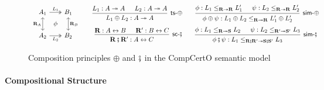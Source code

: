 \documentclass[acmsmall,screen,review,anonymous]{acmart}
\newcommand{\kw}[1]{\ensuremath{ \mathsf{#1} }}
\newcommand{\vcomp}{\fatsemi}
\begin{document}

\begin{figure} %
  \[
  \begin{array}{c}
    \begin{tikzcd}[sep=0.5ex]
      A_1 \ar[dd, leftrightarrow, "\mathbf{R}_A"']
	  \ar[rr, twoheadrightarrow, "L_1"] &&
      B_1 \ar[dd, leftrightarrow, "\mathbf{R}_B"] \\
      & \phi & \\
      A_2 \ar[rr, twoheadrightarrow, "L_2"'] &&
      B_2
    \end{tikzcd}
  \end{array}
  \quad
  \begin{array}{c}
    \begin{prooftree}
      \hypo{L_1 : A \twoheadrightarrow A}
      \hypo{L_2 : A \twoheadrightarrow A}
      \infer2[\kw{ts}-$\oplus$]{L_1 \oplus L_2 : A \twoheadrightarrow A}
    \end{prooftree}
    \qquad
    \begin{prooftree}
      \hypo{\phi: L_1 \le_{\mathbf{R} \twoheadrightarrow \mathbf{R}} L_1'}
      \hypo{\psi: L_2 \le_{\mathbf{R} \twoheadrightarrow \mathbf{R}} L_2'}
      \infer2[\kw{sim}-$\oplus$]{\phi \oplus \psi :
	L_1 \oplus L_2 \le_{\mathbf{R} \twoheadrightarrow \mathbf{R}} L_1' \oplus L_2'}
    \end{prooftree}
    \\[1.5em]
    \begin{prooftree}
      \hypo{\mathbf{R} : A \leftrightarrow B}
      \hypo{\mathbf{R}' : B \leftrightarrow C}
      \infer2[\kw{sc}-$\vcomp$]{\mathbf{R} \vcomp \mathbf{R}' : A \leftrightarrow C}
    \end{prooftree}
    \qquad
    \begin{prooftree}
      \hypo{\phi : L_1 \le_{\mathbf{R} \twoheadrightarrow \mathbf{S}} L_2}
      \hypo{\psi : L_2 \le_{\mathbf{R'} \twoheadrightarrow \mathbf{S'}} L_3}
      \infer2[\kw{sim}-$\vcomp$]{\phi \vcomp \psi : L_1 \le_{\mathbf{R} \vcomp \mathbf{R'} \twoheadrightarrow
	\mathbf{S} \vcomp \mathbf{S'}} L_3}
    \end{prooftree}
  \end{array}
  \]
  \caption{Composition principles $\oplus$ and $\vcomp$ in the CompCertO semantic model}
  \label{fig:compcerto}
\end{figure}

\paragraph{Compositional Structure} %
\end{document}
